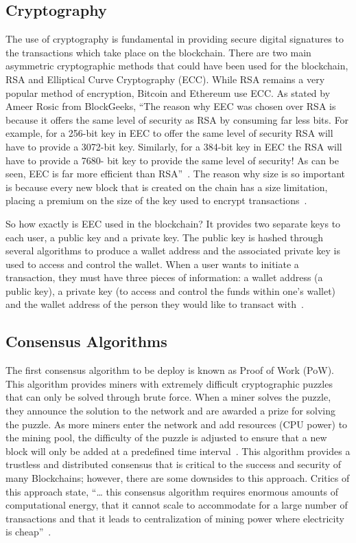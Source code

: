 \subsection{Cryptography}

The use of cryptography is fundamental in providing secure digital signatures to the transactions which take place on the blockchain. There are two main asymmetric cryptographic methods that could have been used for the blockchain, RSA and Elliptical Curve Cryptography (ECC). While RSA remains a very popular method of encryption, Bitcoin and Ethereum use ECC. As stated by Ameer Rosic from BlockGeeks, ``The reason why EEC was chosen over RSA is because it offers the same level of security as RSA by consuming far less bits. For example, for a 256-bit key in EEC to offer the same level of security RSA will have to provide a 3072-bit key. Similarly, for a 384-bit key in EEC the RSA will have to provide a 7680- bit key to provide the same level of security! As can be seen, EEC is far more efficient than RSA''~\cite{hid-sp18-414-www-science-cryptocurrencies-cryptography}. The reason why size is so important is because every new block that is created on the chain has a size limitation, placing a premium on the size of the key used to encrypt transactions~\cite{hid-sp18-414-www-ECDSA-vs-RSA}.

So how exactly is EEC used in the blockchain? It provides two separate keys to each user, a public key and a private key. The public key is hashed through several algorithms to produce a wallet address and the associated private key is used to access and control the wallet. When a user wants to initiate a transaction, they must have three pieces of information: a wallet address (a public key), a private key (to access and control the funds within one’s wallet) and the wallet address of the person they would like to transact with~\cite{hid-sp18-414-www-science-cryptocurrencies-cryptography}.

\subsection{Consensus Algorithms}

The first consensus algorithm to be deploy is known as Proof of Work (PoW). This algorithm provides miners with extremely difficult cryptographic puzzles that can only be solved through brute force. When a miner solves the puzzle, they announce the solution to the network and are awarded a prize for solving the puzzle. As more miners enter the network and add resources (CPU power) to the mining pool, the difficulty of the puzzle is adjusted to ensure that a new block will only be added at a predefined time interval~\cite{hid-sp18-414-www-pow-vs-pos}. This algorithm provides a trustless and distributed consensus that is critical to the success and security of many Blockchains; however, there are some downsides to this approach. Critics of this approach state, ``… this consensus algorithm requires enormous amounts of computational energy, that it cannot scale to accommodate for a large number of transactions and that it leads to centralization of mining power where electricity is cheap''~\cite{hid-sp18-414-www-blockchain-consensus-protocols}.

